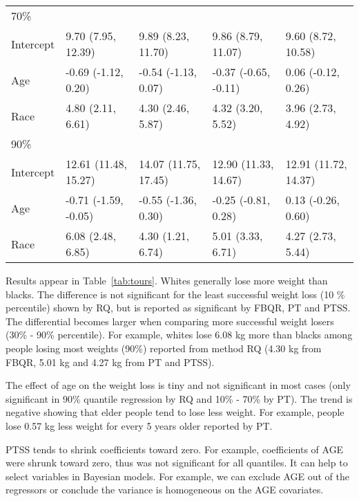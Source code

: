 \documentclass[12pt]{article}
\begin{document}
\begin{table}[h]
\begin{tabular}[tb]{l|l|l|l|l}
    \hline
    70\%      &                      &                      &                      &                      \\
    Intercept & 9.70 (7.95, 12.39)   & 9.89 (8.23, 11.70)   & 9.86 (8.79, 11.07)   & 9.60 (8.72, 10.58)   \\
    Age       & -0.69 (-1.12, 0.20)  & -0.54 (-1.13, 0.07)  & -0.37 (-0.65, -0.11) & 0.06 (-0.12, 0.26)   \\
    Race      & 4.80 (2.11, 6.61)    & 4.30 (2.46, 5.87)    & 4.32 (3.20, 5.52)    & 3.96 (2.73, 4.92)    \\
    \hline
    90\%      &                      &                      &                      &                      \\
    Intercept & 12.61 (11.48, 15.27) & 14.07 (11.75, 17.45) & 12.90 (11.33, 14.67) & 12.91 (11.72, 14.37) \\
    Age       & -0.71 (-1.59, -0.05) & -0.55 (-1.36, 0.30)  & -0.25 (-0.81, 0.28)  & 0.13 (-0.26, 0.60)   \\
    Race      & 6.08 (2.48, 6.85)    & 4.30 (1.21, 6.74)    & 5.01 (3.33, 6.71)    & 4.27 (2.73, 5.44)    \\
    \bottomrule
  \end{tabular}
\end{table}

Results appear in Table~\ref{tab:tours}.  Whites generally lose more
weight than blacks. The difference is not significant for the least
successful weight loss (10 \% percentile) shown by RQ, but is reported
as significant by FBQR, PT and PTSS. The differential becomes larger
when comparing more successful weight losers (30\% - 90\%
percentile). For example, whites lose 6.08 kg more than blacks among
people losing most weights (90\%) reported from method RQ (4.30 kg
from FBQR, 5.01 kg and 4.27 kg from PT and PTSS).

The effect of age on the weight loss is tiny and not significant in
most cases (only significant in 90\% quantile regression by RQ and
10\% - 70\% by PT). The trend is negative showing that elder people
tend to lose less weight. For example, people lose 0.57 kg less weight
for every 5 years older reported by PT.

PTSS tends to shrink coefficients toward zero. For example,
coefficients of AGE were shrunk toward zero, thus was not significant
for all quantiles. It can help to select variables in Bayesian
models. For example, we can exclude AGE out of the regressors or
conclude the variance is homogeneous on the AGE covariates.
\end{document}
